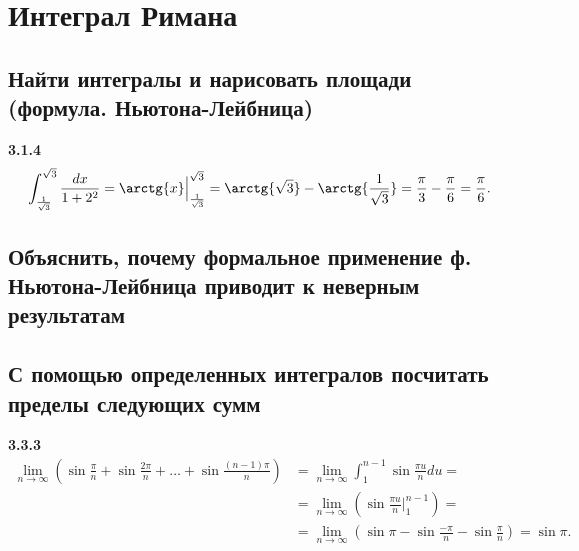 \section{Интеграл Римана}

\subsection{Найти интегралы и нарисовать площади (формула. Ньютона-Лейбница)}
\textbf{3.1.4} \\
\begin{align*}
  \int_{\frac{1}{\sqrt{3}}}^{\sqrt{3}} \frac{dx}{1+2^2} = 
    \arctg{x}\Big|^{\sqrt{3}}_{\frac{1}{\sqrt{3}}} = 
    \arctg{\sqrt{3}} - \arctg{\frac{1}{\sqrt{3}}} = \frac{\pi}{3} - \frac{\pi}{6} =
    \frac{\pi}{6}
.\end{align*}
\subsection{Объяснить, почему формальное применение ф. Ньютона-Лейбница приводит к неверным результатам}
\subsection{С помощью определенных интегралов посчитать пределы следующих сумм}
\textbf{3.3.3} \\
\begin{align*}
\lim_{n \to \infty} \left( \sin \frac{\pi}{n} + \sin \frac{2\pi}{n} + \ldots + \sin \frac{(n-1)\pi }{n} \right) 
&= \lim_{n \to \infty} \int_{1}^{n-1} \sin \frac{\pi u}{n} du = \\
&= \lim_{n \to \infty} \left( \sin \frac{\pi u}{n}\Big|^{n-1}_1 \right) = \\
&= \lim_{n \to \infty} \left( \sin \pi - \sin \frac{-\pi }{n} - \sin\frac{\pi}{n} \right) =
\boxed{\sin \pi}
.\end{align*}
